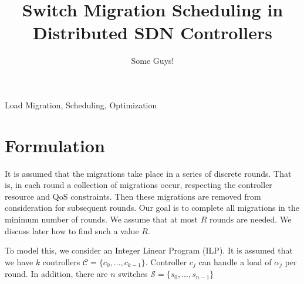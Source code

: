 \documentclass[conference]{IEEEtran}
\begin{document}
\title{Switch Migration Scheduling in Distributed SDN Controllers}

\author{Some Guys!}

\maketitle

\begin{abstract}
\blindtext
\end{abstract}

\begin{IEEEkeywords}
Load Migration, Scheduling, Optimization
\end{IEEEkeywords}

\IEEEpeerreviewmaketitle

\section{Formulation}

\noindent It is assumed that the migrations take place in a series of discrete rounds. That is, in each round a collection of migrations occur, respecting the controller resource and QoS constraints. Then these migrations are removed from consideration for subsequent rounds. Our goal is to complete all migrations in the minimum number of rounds. We assume that at most $R$ rounds are needed. We discuss later how to find such a value $R$.

To model this, we consider an Integer Linear Program (ILP). It is assumed that we have $k$ controllers $\mathcal{C} = \{c_{0}, ..., c_{k-1}\}$. Controller $c_{j}$ can handle a load of $\alpha_{j}$ per round. In addition, there are $n$ switches $\mathcal{S} = \{s_{0}, ..., s_{n-1}\}$
\end{document}
